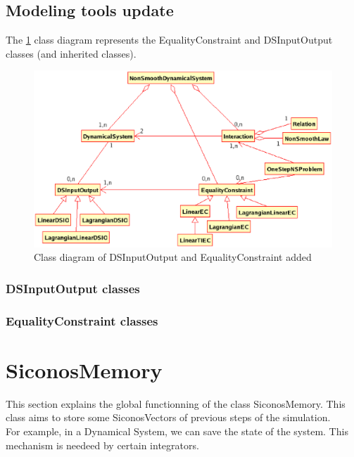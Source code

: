 \subsection{Modeling tools update}
The \ref{fig: Class diagram of DSInputOutput and EqualityConstraint added} class diagram represents the EqualityConstraint and DSInputOutput classes (and inherited classes).
	\begin{figure}
	\begin{center}
	\includegraphics[scale=0.85, clip]{figure/EC.eps}
	\caption{Class diagram of DSInputOutput and EqualityConstraint added}
	\label{fig: Class diagram of DSInputOutput and EqualityConstraint added}
	\end{center}
	\end{figure}
	
\subsubsection{DSInputOutput classes}

\subsubsection{EqualityConstraint classes}



\pagebreak

\section{SiconosMemory}
	
This section explains the global functionning of the class SiconosMemory. This class aims to store some SiconosVectors of previous steps of the simulation.\\
For example, in a Dynamical System, we can save the state of the system. This mechanism is needeed by certain integrators. \\


